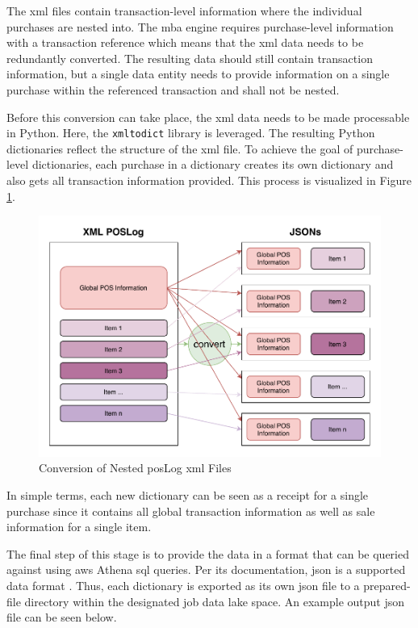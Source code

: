 The \ac{xml} files contain transaction-level information where the individual purchases are nested into. The \ac{mba} engine requires purchase-level information with a transaction reference which means that the \ac{xml} data needs to be redundantly converted. The resulting data should still contain transaction information, but a single data entity needs to provide information on a single purchase within the referenced transaction and shall not be nested.

Before this conversion can take place, the \ac{xml} data needs to be made processable in Python. Here, the \texttt{xmltodict} library is leveraged. The resulting Python dictionaries reflect the structure of the \ac{xml} file. To achieve the goal of purchase-level dictionaries, each purchase in a dictionary creates its own dictionary and also gets all transaction information provided. This process is visualized in Figure \ref{fig:3-convert-process}. %

\begin{figure}[h!]
	\centering
	\includegraphics[width=0.67\linewidth]{main-matter/img/3-convert-process.pdf}
	\caption{Conversion of Nested \acs{pos}Log \acs{xml} Files}
	\label{fig:3-convert-process}
\end{figure}

In simple terms, each new dictionary can be seen as a receipt for a single purchase since it contains all global transaction information as well as sale information for a single item.

The final step of this stage is to provide the data in a format that can be queried against using \ac{aws} Athena \ac{sql} queries. Per its documentation, \ac{json} is a supported data format \cite{athena}. Thus, each dictionary is exported as its own \ac{json} file to a prepared-file directory within the designated job data lake space. An example output \ac{json} file can be seen below.

